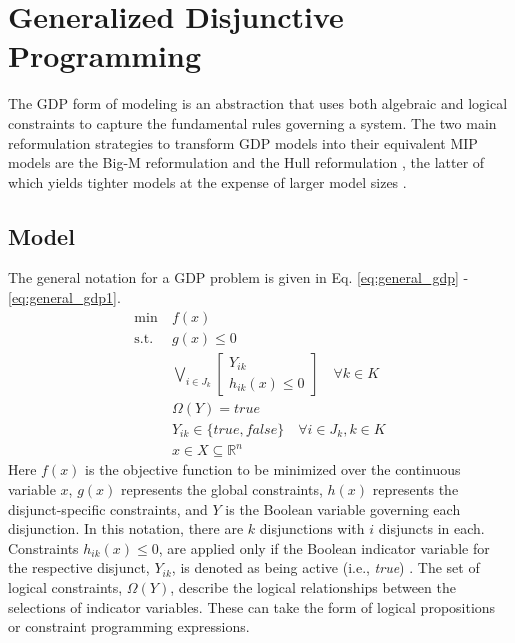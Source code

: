 \documentclass{juliacon}
\begin{document}
\section{Generalized Disjunctive Programming}
The GDP form of modeling is an abstraction that uses both algebraic and logical constraints to capture the fundamental rules governing a system. The two main reformulation strategies to transform GDP models into their equivalent MIP models are the Big-M reformulation \cite{nemhauser_1999, TRESPALACIOS201598} and the Hull reformulation \cite{LEE20002125}, the latter of which yields tighter models at the expense of larger model sizes \cite{grossmann_lee_2003}. 
\vskip 6pt

\subsection{Model}

The general notation for a GDP problem is given in Eq. \eqref{eq:general_gdp} - \eqref{eq:general_gdp1}.
\begin{align}
    \label{eq:general_gdp}
    \min \ &f(x) \\
    \text{s.t.} \ &g(x) \leq 0 \\
    &\bigvee_{i \in J_k}
    \begin{bmatrix}
        Y_{ik} \\
        h_{ik}(x) \leq 0
    \end{bmatrix} \quad \forall k \in K \\
    & \Omega(Y) = true \\
    & Y_{ik} \in \{true, false\} \quad \forall i \in J_k, k \in K\\
    \label{eq:general_gdp1}
    & x \in X \subseteq \mathbb{R}^n
\end{align}
Here $f(x)$ is the objective function to be minimized over the continuous variable $x$, $g(x)$ represents the global constraints, $h(x)$ represents the disjunct-specific constraints, and $Y$ is the Boolean variable governing each disjunction. In this notation, there are $k$ disjunctions with $i$ disjuncts in each. Constraints $h_{ik}(x) \le 0$, are applied only if the Boolean indicator variable for the respective disjunct, $Y_{ik}$, is denoted as being active (i.e., \textit{true}) \cite{chen_grossmann_2019}. The set of logical constraints, $\Omega(Y)$, describe the logical relationships between the selections of indicator variables. These can take the form of logical propositions or constraint programming expressions.
\vskip 6pt
\end{document}
